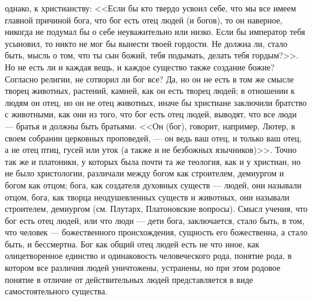 \documentclass[12pt]{article}
\begin{document}
однако, к христианству: <<Если бы кто твердо усвоил себе, что мы все имеем главной причиной бога, что бог есть отец людей (и богов), то он наверное, никогда не подумал бы о себе неуважительно или низко. Если бы император тебя усыновил, то никто не мог бы вынести твоей гордости. Не должна ли, стало быть, мысль о том, что ты сын божий, тебя подымать, делать тебя гордым?>>. Но не есть ли и каждая вещь, и каждое существо также создание божие? Согласно религии, не сотворил ли бог все? Да, но он не есть в том же смысле творец животных, растений, камней, как он есть творец людей; в отношении к людям он отец, но он не отец животных, иначе бы христиане заключили братство с животными, как они из того, что бог есть отец людей, выводят, что все люди --- братья и должны быть братьями. <<Он (бог), говорит, например, Лютер, в своем собрании церковных проповедей, --- он ведь ваш отец, и только ваш отец, а не отец птиц, гусей или уток (а также и не безбожных язычников)>>. Точно так же и платоники, у которых была почти та же теология, как и у христиан, но не было христологии, различали между богом как строителем, демиургом и богом как отцом; бога, как создателя духовных существ --- людей, они называли отцом, бога, как творца неодушевленных существ и животных, они называли строителем, демиургом (см. Плутарх, Платоновские вопросы). Смысл учения, что бог есть отец людей, или что люди --- дети бога, заключается, стало быть, в том, что человек --- божественного происхождения, сущность его божественна, а стало быть, и бессмертна. Бог как общий отец людей есть не что иное, как олицетворенное единство и одинаковость человеческого рода, понятие рода, в котором все различия людей уничтожены, устранены, но при этом родовое понятие в отличие от действительных людей представляется в виде самостоятельного существа. 
\end{document}

